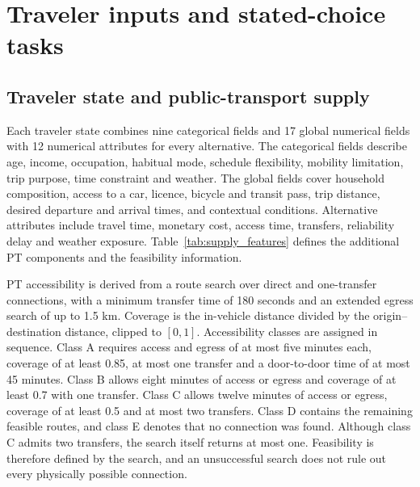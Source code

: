 \section{Traveler inputs and stated-choice tasks}
\label{sec:supp_inputs}
\subsection{Traveler state and public-transport supply}
Each traveler state combines nine categorical fields and 17 global numerical fields with 12 numerical attributes for every alternative. The categorical fields describe age, income, occupation, habitual mode, schedule flexibility, mobility limitation, trip purpose, time constraint and weather. The global fields cover household composition, access to a car, licence, bicycle and transit pass, trip distance, desired departure and arrival times, and contextual conditions. Alternative attributes include travel time, monetary cost, access time, transfers, reliability delay and weather exposure. Table~\ref{tab:supply_features} defines the additional PT components and the feasibility information.

PT accessibility is derived from a route search over direct and one-transfer connections, with a minimum transfer time of 180 seconds and an extended egress search of up to 1.5 km. Coverage is the in-vehicle distance divided by the origin--destination distance, clipped to $[0,1]$. Accessibility classes are assigned in sequence. Class A requires access and egress of at most five minutes each, coverage of at least 0.85, at most one transfer and a door-to-door time of at most 45 minutes. Class B allows eight minutes of access or egress and coverage of at least 0.7 with one transfer. Class C allows twelve minutes of access or egress, coverage of at least 0.5 and at most two transfers. Class D contains the remaining feasible routes, and class E denotes that no connection was found. Although class C admits two transfers, the search itself returns at most one. Feasibility is therefore defined by the search, and an unsuccessful search does not rule out every physically possible connection.

